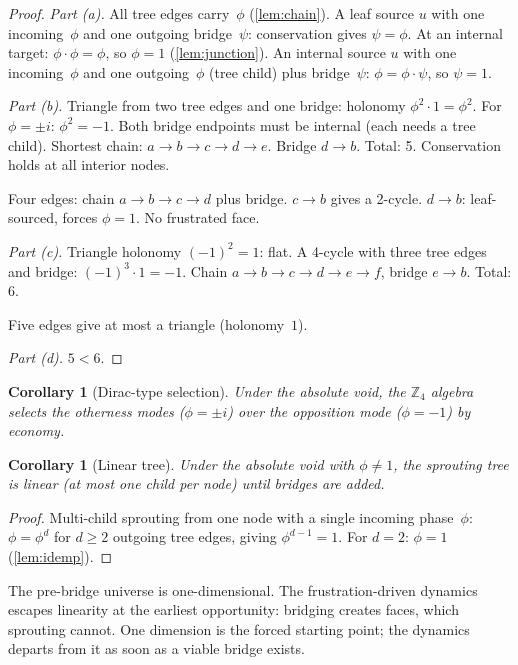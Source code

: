 \documentclass[11pt,a4paper]{article}
\theoremstyle{definition}
\theoremstyle{plain}
\newtheorem{corollary}[definition]{Corollary}
\theoremstyle{remark}
\newcommand{\Zf}{\mathbb{Z}_4}
\begin{document}
\begin{proof}
  \emph{Part (a).}  All tree edges carry~$\phi$ (\cref{lem:chain}).  A leaf source $u$ with one incoming~$\phi$ and one outgoing bridge~$\psi$: conservation gives $\psi = \phi$.  At an internal target: $\phi \cdot \phi = \phi$, so $\phi = 1$ (\cref{lem:junction}).  An internal source $u$ with one incoming~$\phi$ and one outgoing~$\phi$ (tree child) plus bridge~$\psi$: $\phi = \phi \cdot \psi$, so $\psi = 1$.

  \emph{Part (b).}  Triangle from two tree edges and one bridge: holonomy $\phi^2 \cdot 1 = \phi^2$.  For $\phi = \pm i$: $\phi^2 = -1$.  Both bridge endpoints must be internal (each needs a tree child).  Shortest chain: $a \to b \to c \to d \to e$.  Bridge $d \to b$.  Total: 5.  Conservation holds at all interior nodes.

  Four edges: chain $a \to b \to c \to d$ plus bridge.  $c \to b$ gives a 2-cycle.  $d \to b$: leaf-sourced, forces $\phi = 1$.  No frustrated face.

  \emph{Part (c).}  Triangle holonomy $(-1)^2 = 1$: flat.  A 4-cycle with three tree edges and bridge: $(-1)^3 \cdot 1 = -1$.  Chain $a \to b \to c \to d \to e \to f$, bridge $e \to b$.  Total: 6.

  Five edges give at most a triangle (holonomy~$1$).

  \emph{Part (d).}  $5 < 6$.
\end{proof}

\begin{corollary}[Dirac-type selection]\label{cor:dirac}
  Under the absolute void, the $\Zf$ algebra selects the otherness modes ($\phi = \pm i$) over the opposition mode ($\phi = -1$) by economy.
\end{corollary}

\begin{corollary}[Linear tree]\label{cor:linear}
  Under the absolute void with $\phi \neq 1$, the sprouting tree is linear (at most one child per node) until bridges are added.
\end{corollary}

\begin{proof}
  Multi-child sprouting from one node with a single incoming phase~$\phi$: $\phi = \phi^d$ for $d \geq 2$ outgoing tree edges, giving $\phi^{d-1} = 1$.  For $d = 2$: $\phi = 1$ (\cref{lem:idemp}).
\end{proof}

The pre-bridge universe is one-dimensional.  The frustration-driven dynamics escapes linearity at the earliest opportunity: bridging creates faces, which sprouting cannot.  One dimension is the forced starting point; the dynamics departs from it as soon as a viable bridge exists.
\end{document}
